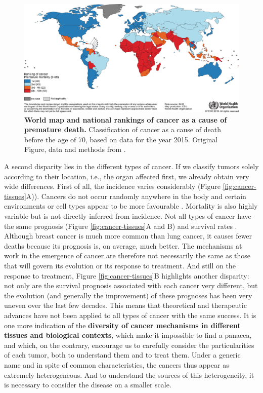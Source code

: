 \documentclass[a4paper,12pt,twoside,onecolumn,openright,final,oldfontcommands]{memoir}
\begin{document}
\begin{figure}

{\centering \includegraphics[width=0.9\linewidth]{fig/globocan-map} 

}

\caption[World map and national rankings of cancer as a cause of premature death]{\textbf{World map and national rankings of
cancer as a cause of premature death.} Classification of cancer as a
cause of death before the age of 70, based on data for the year 2015.
Original Figure, data and methods from \citet{bray2018global}.}\label{fig:globocan-map}
\end{figure}






A second disparity lies in the different types of cancer. If we classify
tumors solely according to their location, i.e., the organ affected
first, we already obtain very wide differences. First of all, the
incidence varies considerably (Figure \ref{fig:cancer-tissues}A)).
Cancers do not occur randomly anywhere in the body and certain
environments or cell types appear to be more favourable
\citep{tomasetti2015variation}. Mortality is also highly variable but is
not directly inferred from incidence. Not all types of cancer have the
same prognosis (Figure \ref{fig:cancer-tissues}A and B) and survival
rates \citep{liu2018integrated}. Although breast cancer is much more
common than lung cancer, it causes fewer deaths because its prognosis
is, on average, much better. The mechanisms at work in the emergence of
cancer are therefore not necessarily the same as those that will govern
its evolution or its response to treatment. And still on the response to
treatment, Figure \ref{fig:cancer-tissues}B highlights another
disparity: not only are the survival prognosis associated with each
cancer very different, but the evolution (and generally the improvement)
of these prognoses has been very uneven over the last few decades. This
means that theoretical and therapeutic advances have not been applied to
all types of cancer with the same success. It is one more indication of
the \textbf{diversity of cancer mechanisms in different tissues and
biological contexts}, which make it impossible to find a panacea, and
which, on the contrary, encourage us to carefully consider the
particularities of each tumor, both to understand them and to treat
them. Under a generic name and in spite of common characteristics, the
cancers thus appear as extremely heterogeneous. And to understand the
sources of this heterogeneity, it is necessary to consider the disease
on a smaller scale.
\end{document}

